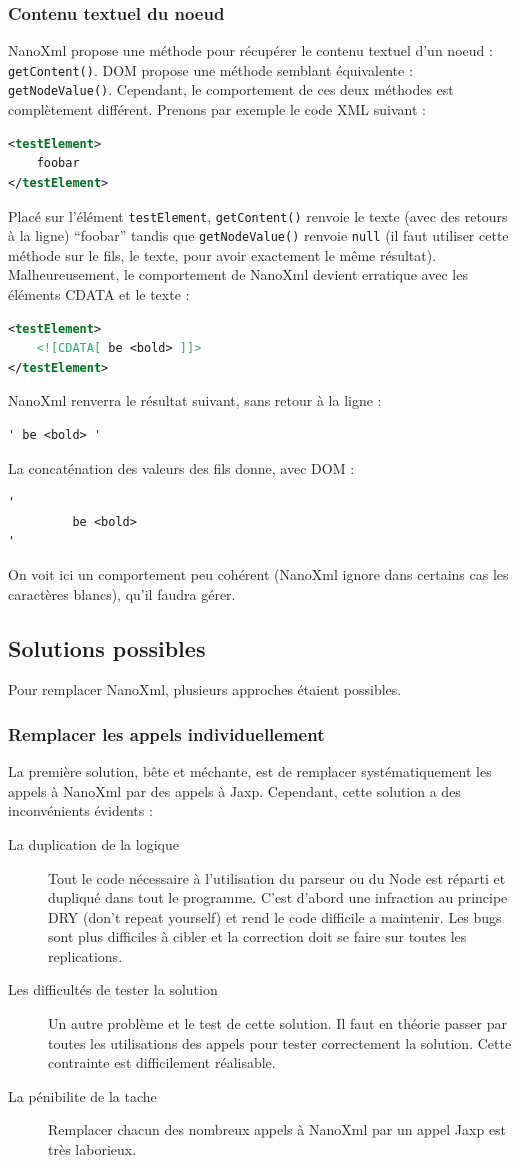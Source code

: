 \subsubsection{Contenu textuel du noeud}
NanoXml propose une méthode pour récupérer le contenu textuel d'un noeud : \verb|getContent()|.
DOM propose une méthode semblant équivalente : \verb|getNodeValue()|.
Cependant, le comportement de ces deux méthodes est complètement différent.
Prenons par exemple le code XML suivant :
\begin{lstlisting}[language=xml]
<testElement>
	foobar
</testElement>
\end{lstlisting}
Placé sur l'élément \verb|testElement|, \verb|getContent()| renvoie le texte (avec des retours à la ligne) ``foobar'' tandis que \verb|getNodeValue()| renvoie \verb|null| (il faut utiliser cette méthode sur le fils, le texte, pour avoir exactement le même résultat).
Malheureusement, le comportement de NanoXml devient erratique avec les éléments CDATA et le texte :
\begin{lstlisting}[language=xml]
<testElement>
	<![CDATA[ be <bold> ]]>
</testElement>
\end{lstlisting}
NanoXml renverra le résultat suivant, sans retour à la ligne :
\begin{verbatim}
' be <bold> '
\end{verbatim}
La concaténation des valeurs des fils donne, avec DOM :
\begin{verbatim}
'
         be <bold> 
'
\end{verbatim}
On voit ici un comportement peu cohérent (NanoXml ignore dans certains cas les caractères blancs), qu'il faudra gérer.

\subsection{Solutions possibles}
Pour remplacer NanoXml, plusieurs approches étaient possibles.

\subsubsection{Remplacer les appels individuellement}
La première solution, bête et méchante, est de remplacer systématiquement les appels à NanoXml par des appels à Jaxp.
Cependant, cette solution a des inconvénients évidents :
\begin{description}
\item[La duplication de la logique] Tout le code nécessaire à l'utilisation du parseur ou du Node est réparti et dupliqué dans tout le programme.
C'est d'abord une infraction au principe DRY (don't repeat yourself) et rend le code difficile a maintenir.
Les bugs sont plus difficiles à cibler et la correction doit se faire sur toutes les replications.
\item[Les difficultés de tester la solution] Un autre problème et le test de cette solution.
Il faut en théorie passer par toutes les utilisations des appels pour tester correctement la solution. Cette contrainte est difficilement réalisable.
\item[La pénibilite de la tache] Remplacer chacun des nombreux appels à NanoXml par un appel Jaxp est très laborieux.
\end{description}
